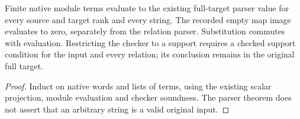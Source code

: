 \begin{proposition}
  \label{prop:lin-native-module-terms-evaluation}
  \leanok
  Finite native module terms evaluate to the existing full-target parser
  value for every source and target rank and every string. The recorded
  empty map image evaluates to zero, separately from the relation parser.
  Substitution commutes with evaluation. Restricting the checker to a support
  requires a checked support condition for the input and every relation;
  its conclusion remains in the original full target.
\end{proposition}
\begin{proof}
  \leanok
  Induct on native words and lists of terms, using the existing scalar
  projection, module evaluation and checker soundness. The parser theorem
  does not assert that an arbitrary string is a valid original input.
\end{proof}

